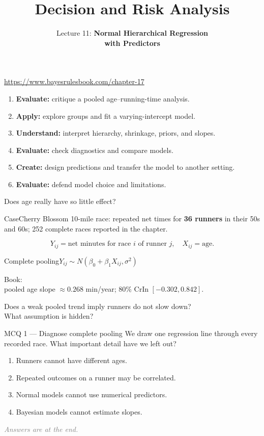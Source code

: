 \documentclass[aspectratio=43,11pt]{beamer}
\title{Decision and Risk Analysis}
\subtitle{Lecture 11: \textbf{Normal Hierarchical Regression\\with Predictors}}
\author{}
\date{\color{aggiemaroon}{DAEN 427 / ISEN 427 / ISEN 627 - Fall 2026\\
      \textbf{Alexander Abuabara}}}
\newcommand{\stage}[2]{\begin{block}{#1}\small #2\end{block}}
\begin{document}
\begin{frame}\titlepage
\centering \footnotesize \url{https://www.bayesrulesbook.com/chapter-17}
\end{frame}

\begin{frame}{}
\begin{enumerate}
\item \textbf{Evaluate:} critique a pooled age--running-time analysis.
\item \textbf{Apply:} explore groups and fit a varying-intercept model.
\item \textbf{Understand:} interpret hierarchy, shrinkage, priors, and slopes.
\item \textbf{Evaluate:} check diagnostics and compare models.
\item \textbf{Create:} design predictions and transfer the model to another setting.
\item \textbf{Evaluate:} defend model choice and limitations.
\end{enumerate}
\end{frame}

\begin{frame}{Does age really have so little effect?}
\stage{Case}{Cherry Blossom 10-mile race: repeated net times for \textbf{36 runners} in their 50s and 60s; 252 complete races reported in the chapter.}
\[Y_{ij}=\text{net minutes for race }i\text{ of runner }j,\quad X_{ij}=\text{age}.\]
\begin{block}{Complete pooling}\centering $Y_{ij}\sim N(\beta_0+\beta_1X_{ij},\sigma^2)$\end{block}
Book:\\
pooled age slope $\approx0.268$ min/year;
80\% CrIn $[-0.302,0.842]$.\par
Does a weak pooled trend imply runners do not slow down?\\
What assumption is hidden?
\end{frame}

\begin{frame}{MCQ 1 --- Diagnose complete pooling}
We draw one regression line through every recorded race. What important detail have we left out?
\begin{enumerate}
\item[A.] Runners cannot have different ages.
\item[B.] Repeated outcomes on a runner may be correlated.
\item[C.] Normal models cannot use numerical predictors.
\item[D.] Bayesian models cannot estimate slopes.
\end{enumerate}
\textcolor{gray}{\it Answers are at the end.}
\end{frame}
\end{document}
